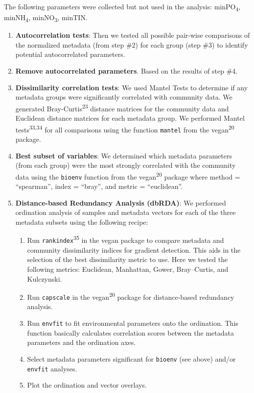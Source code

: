 \documentclass[
  10pt,
  letterpaper,
  DIV=11,
  numbers=noendperiod]{scrartcl}
\providecommand{\tightlist}{%
  \setlength{\itemsep}{0pt}\setlength{\parskip}{0pt}}\usepackage{longtable,booktabs,array}
\begin{document}
The following parameters were collected but not used in the analysis:
minPO\textsubscript{4}, minNH\textsubscript{4}, minNO\textsubscript{3},
minTIN.

\begin{enumerate}
\def\labelenumi{\arabic{enumi})}
\setcounter{enumi}{3}
\item
  \textbf{Autocorrelation tests}: Then we tested all possible pair-wise
  comparisons of the normalized metadata (from step \#2) for each group
  (step \#3) to identify potential autocorrelated parameters.
\item
  \textbf{Remove autocorrelated parameters}. Based on the results of
  step \#4.
\item
  \textbf{Dissimilarity correlation tests}: We used Mantel Tests to
  determine if any metadata groups were significantly correlated with
  community data. We generated Bray-Curtis\textsuperscript{23} distance
  matrices for the community data and Euclidean distance matrices for
  each metadata group. We performed Mantel tests\textsuperscript{33,34}
  for all comparisons using the function \texttt{mantel} from the
  vegan\textsuperscript{20} package.
\item
  \textbf{Best subset of variables}: We determined which metadata
  parameters (from each group) were the most strongly correlated with
  the community data using the \texttt{bioenv} function from the
  vegan\textsuperscript{20} package where method = ``spearman'', index =
  ``bray'', and metric = ``euclidean''.
\item
  \textbf{Distance-based Redundancy Analysis (dbRDA)}: We performed
  ordination analysis of samples and metadata vectors for each of the
  three metadata subsets using the following recipe:

  \begin{enumerate}
  \def\labelenumii{\roman{enumii})}
  \tightlist
  \item
    Run \texttt{rankindex}\textsuperscript{35} in the vegan package to
    compare metadata and community dissimilarity indices for gradient
    detection. This aids in the selection of the best dissimilarity
    metric to use. Here we tested the following metrics: Euclidean,
    Manhattan, Gower, Bray--Curtis, and Kulczynski.
  \item
    Run \texttt{capscale} in the vegan\textsuperscript{20} package for
    distance-based redundancy analysis.
  \item
    Run \texttt{envfit} to fit environmental parameters onto the
    ordination. This function basically calculates correlation scores
    between the metadata parameters and the ordination axes.
  \item
    Select metadata parameters significant for \texttt{bioenv} (see
    above) and/or \texttt{envfit} analyses.
  \item
    Plot the ordination and vector overlays.
  \end{enumerate}
\end{enumerate}
\end{document}
